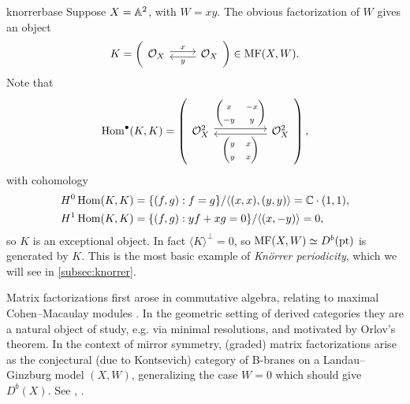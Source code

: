 \begin{example}{}{knorrerbase}
     Suppose $X=\mathbb{A}^2$, with $W=xy$. The obvious factorization of $W$ gives an
     object
     \begin{equation*}
         K = \left(\begin{tikzcd}
             \O_X \ar[r,"x",shift left] &
             \O_X \ar[l,"y",shift left]
         \end{tikzcd}\right) \in\MF(X,W).
     \end{equation*}
     Note that
     \begin{equation*}
         \Hom^\bullet(K,K) =
         \left(\begin{tikzcd}[ampersand replacement=\&,column sep=huge]
                 \O_X^2 \ar[shift left]{r}{\begin{pmatrix}
                     x & -x \\ -y & y
                 \end{pmatrix}} \&
                 \O_X^2 \ar[shift left]{l}{\begin{pmatrix}
                     y & x \\ y & x
                 \end{pmatrix}}
         \end{tikzcd}\right),
     \end{equation*}
     with cohomology
     \begin{align*}
         H^0\operatorname{Hom}(K,K) &= \{(f,g):f=g\}/\langle(x,x),(y,y)\rangle
             = \mathbb{C}\cdot(1,1), \\
         H^1\operatorname{Hom}(K,K) &= \{(f,g):yf+xg=0\}/\langle(x,-y)\rangle
             = 0,
     \end{align*}
     so $K$ is an exceptional object. In fact $\langle K\rangle^\perp=0$, so
     $\operatorname{MF}(X,W)\simeq D^b(\mathrm{pt})$ is generated by $K$. This is the most basic
     example of \emph{Kn\"orrer periodicity}, which we will see in
     \ref{subsec:knorrer}.
\end{example}

\begin{remark}{}{}
    Matrix factorizations first arose in commutative algebra, relating to
    maximal Cohen--Macaulay modules \cite{Eisenbud}. In the geometric setting of
    derived categories they are a natural object of study, e.g. via minimal
    resolutions, and motivated by Orlov's theorem. In the context of mirror
    symmetry, (graded) matrix factorizations arise as the conjectural (due to
    Kontsevich) category of B-branes on a Landau--Ginzburg model $(X,W)$,
    generalizing the case $W=0$ which should give $D^b(X)$. See
    \cite{OrlovTheorem}, \cite{ed_gitlg_2011}.
\end{remark}

